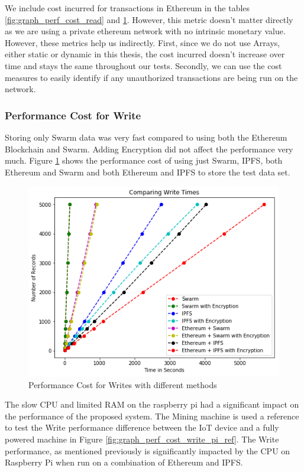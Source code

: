 \documentclass[11pt,openright]{report}
\begin{document}
We include cost incurred for transactions in Ethereum in the tables \ref{fig:graph_perf_cost_read} and \ref{fig:graph_perf_cost_write}. However, this metric doesn't matter directly as we are using a private ethereum network with no intrinsic monetary value. However, these metrics help us indirectly. First, since we do not use Arrays, either static or dynamic in this thesis, the cost incurred doesn't increase over time and stays the same throughout our tests. Secondly, we can use the cost measures to easily identify if any unauthorized transactions are being run on the network.

\subsubsection{Performance Cost for Write}
Storing only Swarm data was very fast compared to using both the Ethereum Blockchain and Swarm. Adding Encryption did not affect the performance very much. Figure \ref{fig:graph_perf_cost_write} shows the performance cost of using just Swarm, IPFS, both Ethereum and Swarm and both Ethereum and IPFS to store the test data set.

\begin{figure}
    \centering
    \includegraphics[scale=0.8]{results/graphs/WriteComp.png}
    \caption{Performance Cost for Writes with different methods}
    \label{fig:graph_perf_cost_write}
\end{figure}

The slow CPU and limited RAM on the raspberry pi had a significant impact on the performance of the proposed system. The Mining machine is used a reference to test the Write performance difference between the IoT device and a fully powered machine in Figure \ref{fig:graph_perf_cost_write_pi_ref}. The Write performance, as mentioned previously is significantly impacted by the CPU on Raspberry Pi when run on a combination of Ethereum and IPFS.
\end{document}
